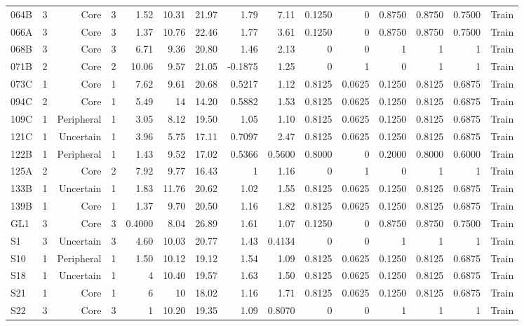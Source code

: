 {\begin{longtable}{lrrrrrrrrrrrrrr}
  064B & 3 & Core & 3 & 1.52 & 10.31 & 21.97 & 1.79 & 7.11 & 0.1250 & 0 & 0.8750 & 0.8750 & 0.7500 & Train \\
  066A & 3 & Core & 3 & 1.37 & 10.76 & 22.46 & 1.77 & 3.61 & 0.1250 & 0 & 0.8750 & 0.8750 & 0.7500 & Train \\
  068B & 3 & Core & 3 & 6.71 & 9.36 & 20.80 & 1.46 & 2.13 & 0 & 0 & 1 & 1 & 1 & Train \\
  071B & 2 & Core & 2 & 10.06 & 9.57 & 21.05 & -0.1875 & 1.25 & 0 & 1 & 0 & 1 & 1 & Train \\
  073C & 1 & Core & 1 & 7.62 & 9.61 & 20.68 & 0.5217 & 1.12 & 0.8125 & 0.0625 & 0.1250 & 0.8125 & 0.6875 & Train \\
  094C & 2 & Core & 1 & 5.49 & 14 & 14.20 & 0.5882 & 1.53 & 0.8125 & 0.0625 & 0.1250 & 0.8125 & 0.6875 & Train \\
  109C & 1 & Peripheral & 1 & 3.05 & 8.12 & 19.50 & 1.05 & 1.10 & 0.8125 & 0.0625 & 0.1250 & 0.8125 & 0.6875 & Train \\
  121C & 1 & Uncertain & 1 & 3.96 & 5.75 & 17.11 & 0.7097 & 2.47 & 0.8125 & 0.0625 & 0.1250 & 0.8125 & 0.6875 & Train \\
  122B & 1 & Peripheral & 1 & 1.43 & 9.52 & 17.02 & 0.5366 & 0.5600 & 0.8000 & 0 & 0.2000 & 0.8000 & 0.6000 & Train \\
  125A & 2 & Core & 2 & 7.92 & 9.77 & 16.43 & 1 & 1.16 & 0 & 1 & 0 & 1 & 1 & Train \\
  133B & 1 & Uncertain & 1 & 1.83 & 11.76 & 20.62 & 1.02 & 1.55 & 0.8125 & 0.0625 & 0.1250 & 0.8125 & 0.6875 & Train \\
  139B & 1 & Core & 1 & 1.37 & 9.70 & 20.50 & 1.16 & 1.82 & 0.8125 & 0.0625 & 0.1250 & 0.8125 & 0.6875 & Train \\
  GL1 & 3 & Core & 3 & 0.4000 & 8.04 & 26.89 & 1.61 & 1.07 & 0.1250 & 0 & 0.8750 & 0.8750 & 0.7500 & Train \\
  S1 & 3 & Uncertain & 3 & 4.60 & 10.03 & 20.77 & 1.43 & 0.4134 & 0 & 0 & 1 & 1 & 1 & Train \\
  S10 & 1 & Peripheral & 1 & 1.50 & 10.12 & 19.12 & 1.54 & 1.09 & 0.8125 & 0.0625 & 0.1250 & 0.8125 & 0.6875 & Train \\
  S18 & 1 & Uncertain & 1 & 4 & 10.40 & 19.57 & 1.63 & 1.50 & 0.8125 & 0.0625 & 0.1250 & 0.8125 & 0.6875 & Train \\
  S21 & 1 & Core & 1 & 6 & 10 & 18.02 & 1.16 & 1.71 & 0.8125 & 0.0625 & 0.1250 & 0.8125 & 0.6875 & Train \\
  S22 & 3 & Core & 3 & 1 & 10.20 & 19.35 & 1.09 & 0.8070 & 0 & 0 & 1 & 1 & 1 & Train \\

\end{longtable}}
